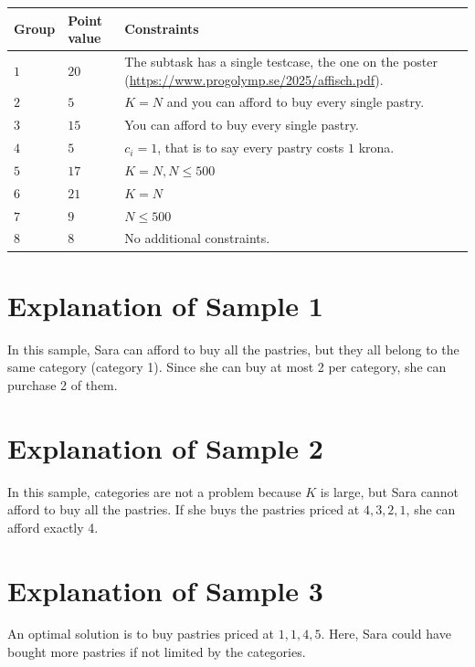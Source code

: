 \noindent
\begin{tabular}{| l | l | p{12cm} |}
  \hline
  \textbf{Group} & \textbf{Point value} & \textbf{Constraints} \\ \hline
  $1$    & $20$       & The subtask has a single testcase, the one on the poster (\url{https://www.progolymp.se/2025/affisch.pdf}). \\ \hline 
  $2$    & $5$        & $K=N$ and you can afford to buy every single pastry. \\ \hline
  $3$    & $15$       & You can afford to buy every single pastry. \\ \hline
  $4$    & $5$        & $c_i=1$, that is to say every pastry costs $1$ krona. \\ \hline
  $5$    & $17$       & $K=N, N \leq 500$ \\ \hline
  $6$    & $21$       & $K=N$ \\ \hline
  $7$    & $9$        & $N \leq 500$ \\ \hline
  $8$    & $8$        & No additional constraints. \\ \hline
\end{tabular}

\section*{Explanation of Sample 1}
In this sample, Sara can afford to buy all the pastries, but they all belong to the same category (category 1).
Since she can buy at most 2 per category, she can purchase 2 of them.

\section*{Explanation of Sample 2}
In this sample, categories are not a problem because $K$ is large, but Sara cannot afford to buy all the pastries.
If she buys the pastries priced at $4, 3, 2, 1$, she can afford exactly 4.

\section*{Explanation of Sample 3}
An optimal solution is to buy pastries priced at $1, 1, 4, 5$. Here, Sara could have bought more pastries if not
limited by the categories.
